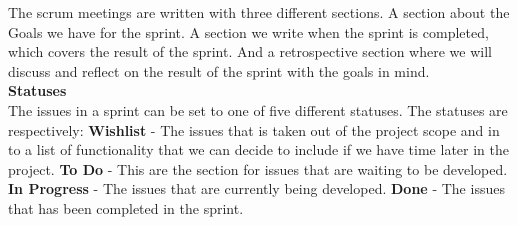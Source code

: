 The scrum meetings are written with three different sections. A section about the Goals we have for the sprint. A section we write when the sprint is completed, which covers the result of the sprint. And a retrospective section where we will discuss and reflect on the result of the sprint with the goals in mind. \\

\textbf{Statuses} \\
The issues in a sprint can be set to one of five different statuses. The statuses are respectively: \textbf{Wishlist} - The issues that is taken out of the project scope and in to a list of functionality that we can decide to include if we have time later in the project. \textbf{To Do} - This are the section for issues that are waiting to be developed. \textbf{In Progress} - The issues that are currently being developed. \textbf{Done} - The issues that has been completed in the sprint.
\\


